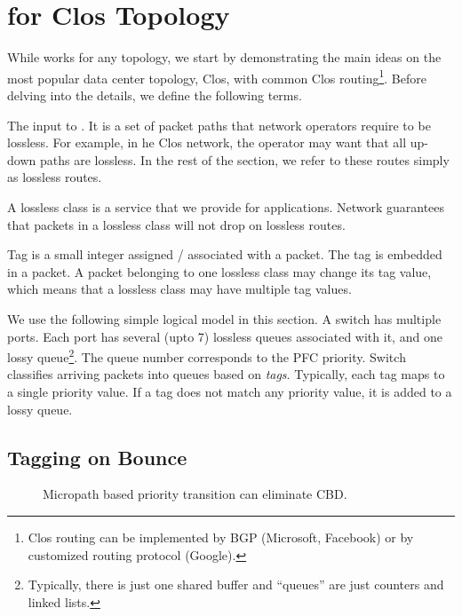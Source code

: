 \section{\sysname{} for Clos Topology}
\label{sec:specific}

While \sysname{} works for any topology, we start by demonstrating the main
ideas on the most popular data center topology, Clos, with common Clos
routing\footnote{Clos routing can be implemented by BGP (Microsoft, Facebook) or
by customized routing protocol (Google).}.  Before delving into the details, we
define the following terms.

 The input to \sysname{}. It is a set of packet paths
that network operators require to be lossless. For example, in he Clos network,
the operator may want that all up-down paths are lossless. In the rest of the
section, we refer to these routes simply as lossless routes.

 A lossless class is a service that we provide for
applications.  Network guarantees that packets in a lossless class will not drop
on lossless routes. 

 Tag is a small integer assigned / associated with a packet. The tag
is embedded in a packet. A packet belonging to one lossless class may change its
tag value, which means that a lossless class may have multiple tag values.

 We use the following simple logical model in this section.
A switch has multiple ports. Each port has several (upto 7) lossless 
queues associated with it, and one lossy queue\footnote{Typically, there is just
one shared buffer and ``queues'' are just counters and linked lists.}.  The
queue number corresponds to the PFC priority.  Switch classifies arriving
packets into queues based on {\em tags}. Typically, each tag maps to a single
priority value. If a tag does not match any priority value, it is added to a
lossy queue. 

\subsection{Tagging on Bounce}\label{subsec:tag}

\begin{figure}[t]
	\centering
	

	
	
	\caption{Micropath based priority transition can eliminate CBD.}\label{fig:priority_transition}
\end{figure}


